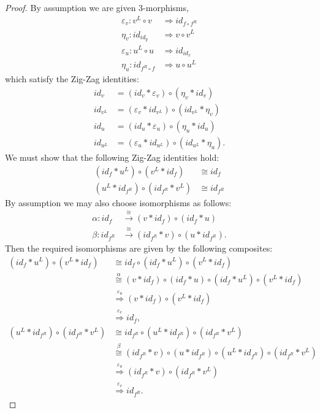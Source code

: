 \documentclass{amsart}
\begin{document}
\begin{proof}
By assumption we are given 3-morphisms,
\begin{align*}
	\varepsilon_v: v^L \circ v & \Rightarrow id_{f \circ f^R} \\
	\eta_v: id_{id_y} & \Rightarrow v \circ v^L \\
	\varepsilon_u: u^L \circ u & \Rightarrow id_{id_x} \\
	\eta_u: id_{f^R \circ f} & \Rightarrow  u \circ u^L
\end{align*}
which satisfy the Zig-Zag identities:
\begin{align*}
	 id_v  &= (id_v * \varepsilon_v) \circ (\eta_v * id_v)  \\
	 id_{v^L}  &= (\varepsilon_v * id_{v^L} ) \circ (id_{v^L} * \eta_v)  \\
	 id_u  &= (id_u * \varepsilon_u) \circ (\eta_u * id_u)  \\
	 id_{u^L}  &= (\varepsilon_u * id_{u^L} ) \circ (id_{u^L} * \eta_u).  
\end{align*}
We must show that the following Zig-Zag identities hold:
\begin{align*}
	 (id_{f} * u^L) \circ (v^L * id_{f} ) & \cong id_{f} \\
 	 (u^L * id_{f^R}) \circ (id_{f^R} * v^L) & \cong id_{f^R} 
\end{align*}
By assumption we may also choose isomorphisms as follows:
\begin{align*}
	\alpha: id_f &\stackrel{\cong}{\to} (v * id_f) \circ (id_f * u) \\
	\beta: id_{f^R} &\stackrel{\cong}{\to} (id_{f^R} * v) \circ (u * id_{f^R} ).
\end{align*}
Then the required isomorphisms are given by the following composites:
\begin{align*}
	(id_{f} * u^L) \circ (v^L * id_{f} )
		& \cong id_f \circ (id_{f} * u^L) \circ (v^L * id_{f} ) \\
		& \stackrel{\alpha}{\cong} (v * id_f) \circ (id_f * u) \circ (id_{f} * u^L) \circ (v^L * id_{f} ) \\
		&  \stackrel{\varepsilon_u }{\Rightarrow} (v * id_f) \circ (v^L * id_{f} ) \\
		& \stackrel{\varepsilon_v }{\Rightarrow} id_{f},  \\
	(u^L * id_{f^R}) \circ (id_{f^R} * v^L) 
		& \cong  id_{f^R} \circ (u^L * id_{f^R}) \circ (id_{f^R} * v^L)  \\
		& \stackrel{\beta}{\cong}  (id_{f^R} * v) \circ (u * id_{f^R} )  \circ (u^L * id_{f^R}) \circ (id_{f^R} * v^L) \\
		& \stackrel{\varepsilon_u }{\Rightarrow} (id_{f^R} * v) \circ (id_{f^R} * v^L) \\
		& \stackrel{\varepsilon_v }{\Rightarrow} id_{f^R}.
\end{align*}
\end{proof}
\end{document}
